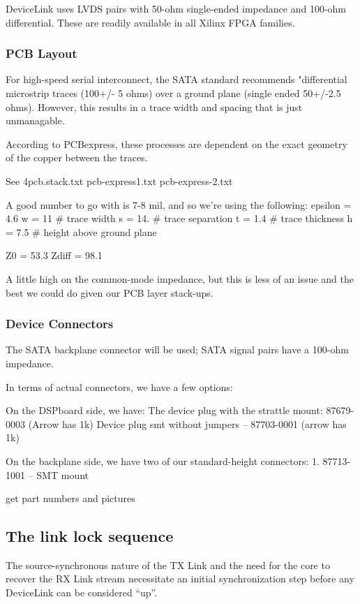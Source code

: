 DeviceLink uses LVDS pairs with 50-ohm single-ended impedance and
100-ohm differential. These are readily available in all Xilinx FPGA
families.

\subsubsection{PCB Layout} 
For high-speed serial interconnect, the SATA standard recommends "differential microstrip traces (100+/- 5 ohms) over a ground plane (single ended 50+/-2.5 ohms). However, this results in a trace width and spacing that is just unmanagable. 

According to PCBexpress, these processes are dependent on the exact
geometry of the copper between the traces.

See 4pcb.stack.txt
    pcb-express1.txt
    pcb-express-2.txt

A good number to go with is 7-8 mil, and so we're using the following:
epsilon = 4.6
w = 11 # trace width 
s = 14. # trace separation 
t = 1.4 # trace thickness 
h = 7.5 # height above ground plane

Z0 =  53.3
Zdiff =  98.1


A little high on the common-mode impedance, but this is less of an issue and the best we could do given our PCB layer stack-ups. 



\subsubsection{Device Connectors}

The SATA backplane connector will be used; SATA signal pairs have a
100-ohm impedance.

In terms of actual connectors, we have a few options: 

On the DSPboard side, we have: 
  The device plug with the strattle mount: 87679-0003 (Arrow has 1k)
  Device plug smt without jumpers -- 87703-0001 (arrow has 1k)

On the backplane side, we have two of our standard-height connectors: 
  1. 87713-1001 -- SMT mount

get part numbers and pictures



\subsection{The link lock sequence}


The source-synchronous nature of the TX Link and the need for the core
to recover the RX Link stream necessitate an initial synchronization
step before any DeviceLink can be considered ``up''.



